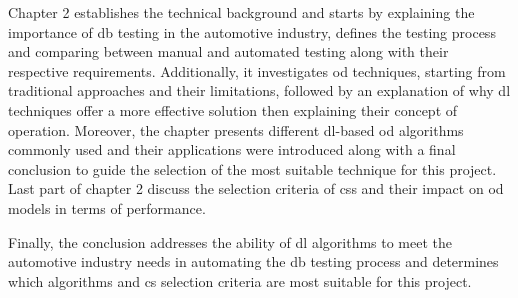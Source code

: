 Chapter 2 establishes the technical background and starts by explaining the importance of \gls{db} testing in the automotive industry, defines the testing process and comparing between manual and automated testing along with their respective requirements. Additionally, it investigates \gls{od} techniques, starting from traditional approaches and their limitations, followed by an explanation of why \gls{dl} techniques offer a more effective solution then explaining their concept of operation. Moreover, the chapter presents different \gls{dl}-based \gls{od} algorithms commonly used and their applications were introduced along with a final conclusion to guide the selection of the most suitable technique for this project. Last part of chapter 2 discuss the selection criteria of \gls{cs}s and their impact on \gls{od} models in terms of performance. 

Finally, the conclusion addresses the ability of \gls{dl} algorithms to meet the automotive industry needs in automating the \gls{db} testing process and determines which algorithms and \gls{cs} selection criteria are most suitable for this project.
